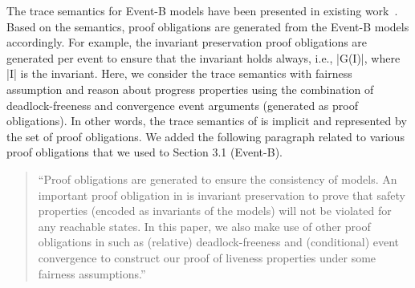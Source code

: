 \documentclass{response}
\begin{document}
\begin{comment}{Reviewer \#1}
- Proof of temporal properties. Different temporal properties are considered. 
Since the proof of such properties are outside (currently) the
Event-B method they have considered other tools and methods.
It would have been interesting to outline the frontier. As a matter of
fact, it is not clear for me if the Event-B properties can be tackled
in temporal logic, e.g., how sequences are embedded? Could you be
precise, comment your embedding?
\end{comment}

\begin{response}
  The trace semantics for Event-B models have been presented in
  existing
  work~\cite{abrial10:_model_event_b,hoang2016ltl,hudon16:_unit_b_method}. Based
  on the semantics, proof obligations are generated from the Event-B
  models accordingly. For example, the invariant preservation proof
  obligations are generated per event to ensure that the invariant
  holds always, i.e., |G(I)|, where |I| is the invariant. Here, we
  consider the trace semantics with fairness assumption and reason
  about progress properties using the combination of deadlock-freeness
  and convergence event arguments (generated as proof obligations). In
  other words, the trace semantics of \EventB is implicit and
  represented by the set of proof obligations.  We added the following
  paragraph related to various proof obligations that we used to
  Section 3.1 (Event-B).
  \begin{quote}
    ``Proof obligations are generated to ensure the consistency of
  \mbox{\EventB} models.  An important proof obligation in
  \mbox{\EventB} is invariant preservation to prove that safety
  properties (encoded as invariants of the models) will not be violated
  for any reachable states. In this paper, we also make use of other
  proof obligations in \mbox{\EventB} such as (relative)
  deadlock-freeness and (conditional) event convergence to construct
  our proof of liveness properties under some fairness assumptions.''
  \end{quote}
\end{response}

\begin{comment}{Reviewer \#1}
- Proof of fairness properties. In order to deal with fairness properties
you advocate a strong fairness assumption. From my point a view, this
is a strong operating assumption. May be you could comment on that?
Last, but may be I am wrong, I have the intuition that weak fairness
for the events handling dequeuing external triggers would be enough?
Please could you comment?
\end{comment}
\end{document}
